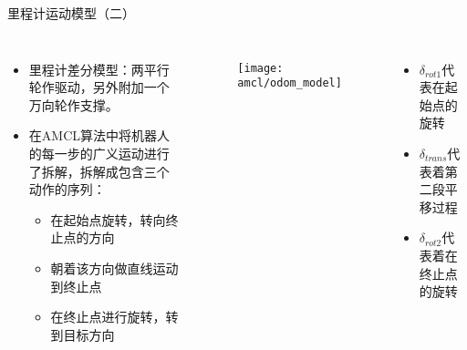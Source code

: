 


  \begin{frame}{里程计运动模型（二）}
    
    \begin{columns}%
    \begin{itemize}
    \item 里程计差分模型：两平行轮作驱动，另外附加一个万向轮作支撑。
    \item 在AMCL算法中将机器人的每一步的广义运动进行了拆解，拆解成包含三个动作的序列：
      \begin{itemize}
        \item 在起始点旋转，转向终止点的方向
         \item 朝着该方向做直线运动到终止点
         \item 在终止点进行旋转，转到目标方向
      \end{itemize}

    \end{itemize}

     \begin{figure}[!h]
      \centering
      \texttt{[image: amcl/odom\_model]}\\
    \end{figure}
    \begin{itemize}
      \item $\delta_{rot1}$代表在起始点的旋转
      \item $\delta_{trans}$代表着第二段平移过程
      \item $\delta_{rot2}$代表着在终止点的旋转
    \end{itemize}
    \end{columns}
    \end{frame}

